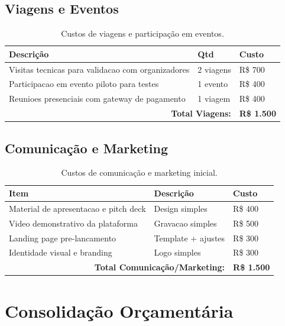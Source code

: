 \subsection{Viagens e Eventos}

\begin{table}[H]
\centering
\caption{Custos de viagens e participação em eventos.}%
\label{tab:viagens}
\small
\begin{tabular}{|p{6cm}|p{2.5cm}|p{3.5cm}|}
\hline
\textbf{Descrição} & \textbf{Qtd} & \textbf{Custo} \\ \hline
Visitas tecnicas para validacao com organizadores & 2 viagens & R\$ 700 \\ \hline
Participacao em evento piloto para testes & 1 evento & R\$ 400 \\ \hline
Reunioes presenciais com gateway de pagamento & 1 viagem & R\$ 400 \\ \hline
\multicolumn{2}{|r|}{\textbf{Total Viagens:}} & \textbf{R\$ 1.500} \\ \hline
\end{tabular}
\end{table}

\subsection{Comunicação e Marketing}

\begin{table}[H]
\centering
\caption{Custos de comunicação e marketing inicial.}%
\label{tab:marketing}
\small
\begin{tabular}{|p{6cm}|p{2.5cm}|p{3.5cm}|}
\hline
\textbf{Item} & \textbf{Descrição} & \textbf{Custo} \\ \hline
Material de apresentacao e pitch deck & Design simples & R\$ 400 \\ \hline
Video demonstrativo da plataforma & Gravacao simples & R\$ 500 \\ \hline
Landing page pre-lancamento & Template + ajustes & R\$ 300 \\ \hline
Identidade visual e branding & Logo simples & R\$ 300 \\ \hline
\multicolumn{2}{|r|}{\textbf{Total Comunicação/Marketing:}} & \textbf{R\$ 1.500} \\ \hline
\end{tabular}
\end{table}

\section{Consolidação Orçamentária}

